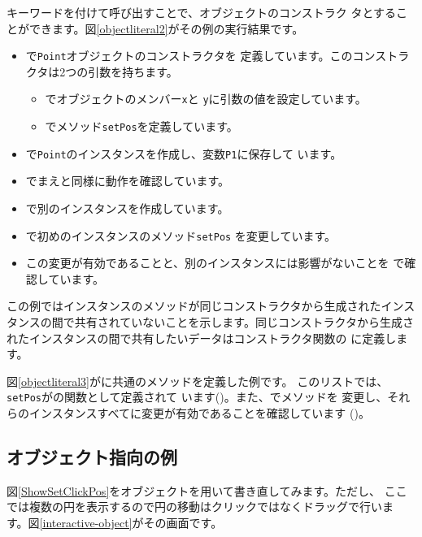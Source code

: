  キーワードを付けて呼び出すことで、オブジェクトのコンストラク
タとすることができます。図\ref{objectliteral2}がその例の実行結果です。
\begin{itemize}
 \item {}で\texttt{Point}オブジェクトのコンストラクタを
       定義しています。このコンストラクタは2つの引数を持ちます。
\begin{itemize}
 \item {}でオブジェクトのメンバー\texttt{x}と
       \texttt{y}に引数の値を設定しています。
 \item {}でメソッド\texttt{setPos}を定義しています。
\end{itemize}
 \item {}で\texttt{Point}のインスタンスを作成し、変数\texttt{P1}に保存して
       います。
 \item {}でまえと同様に動作を確認しています。
 \item {}で別のインスタンスを作成しています。
 \item {}で初めのインスタンスのメソッド\texttt{setPos}
       を変更しています。
 \item この変更が有効であることと、別のインスタンスには影響がないことを
       で確認しています。
\end{itemize}
この例ではインスタンスのメソッドが同じコンストラクタから生成されたインス
タンスの間で共有されていないことを示します。同じコンストラクタから生成さ
れたインスタンスの間で共有したいデータはコンストラクタ関数の
に定義します。

図\ref{objectliteral3}がに共通のメソッドを定義した例です。
このリストでは、\texttt{setPos}がの関数として定義されて
います()。また、でメソッドを
変更し、それらのインスタンスすべてに変更が有効であることを確認しています
()。
\subsection{オブジェクト指向の例}
図\ref{ShowSetClickPos}をオブジェクトを用いて書き直してみます。ただし、
ここでは複数の円を表示するので円の移動はクリックではなくドラッグで行いま
す。図\ref{interactive-object}がその画面です。


